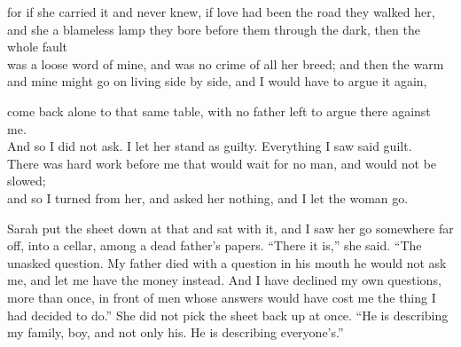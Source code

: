 \begin{scripture}
for if she carried it and never knew, if love had been the road they walked her, \\
and she a blameless lamp they bore before them through the dark, then the whole fault \\
was a loose word of mine, and was no crime of all her breed; and then the warm \\
and mine might go on living side by side, and I would have to argue it again, \\
\medskip

come back alone to that same table, with no father left to argue there against me. \\
And so I did not ask. I let her stand as guilty. Everything I saw said guilt. \\
There was hard work before me that would wait for no man, and would not be slowed; \\
and so I turned from her, and asked her nothing, and I let the woman go. \\
\end{scripture}

\ornament

Sarah put the sheet down at that and sat with it, and I saw her go somewhere far off, into a cellar, among a dead father's papers. ``There it is,'' she said. ``The unasked question. My father died with a question in his mouth he would not ask me, and let me have the money instead. And I have declined my own questions, more than once, in front of men whose answers would have cost me the thing I had decided to do.'' She did not pick the sheet back up at once. ``He is describing my family, boy, and not only his. He is describing everyone's.''\par

\ornament

